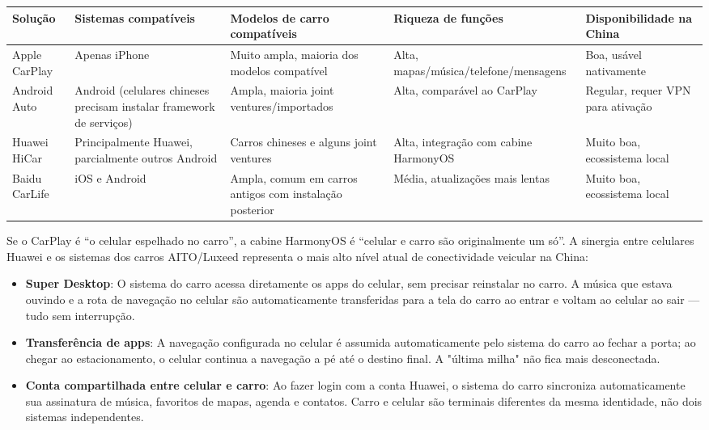 \begin{center}
\begin{tabularx}{\linewidth}{|X|X|X|X|X|}
\hline
\textbf{Solução} & \textbf{Sistemas compatíveis} & \textbf{Modelos de carro compatíveis} & \textbf{Riqueza de funções} & \textbf{Disponibilidade na China} \tabularnewline
\hline
Apple CarPlay & Apenas iPhone & Muito ampla, maioria dos modelos compatível & Alta, mapas/música/telefone/mensagens & Boa, usável nativamente \tabularnewline
Android Auto & Android (celulares chineses precisam instalar framework de serviços) & Ampla, maioria joint ventures/importados & Alta, comparável ao CarPlay & Regular, requer VPN para ativação \tabularnewline
Huawei HiCar & Principalmente Huawei, parcialmente outros Android & Carros chineses e alguns joint ventures & Alta, integração com cabine HarmonyOS & Muito boa, ecossistema local \tabularnewline
Baidu CarLife & iOS e Android & Ampla, comum em carros antigos com instalação posterior & Média, atualizações mais lentas & Muito boa, ecossistema local \tabularnewline
\hline
\end{tabularx}
\end{center}


Se o CarPlay é “o celular espelhado no carro”, a cabine HarmonyOS é “celular e carro são originalmente um só”. A sinergia entre celulares Huawei e os sistemas dos carros AITO/Luxeed representa o mais alto nível atual de conectividade veicular na China:

\begin{itemize}
  \item \textbf{Super Desktop}: O sistema do carro acessa diretamente os apps do celular, sem precisar reinstalar no carro. A música que estava ouvindo e a rota de navegação no celular são automaticamente transferidas para a tela do carro ao entrar e voltam ao celular ao sair — tudo sem interrupção.
  \item \textbf{Transferência de apps}: A navegação configurada no celular é assumida automaticamente pelo sistema do carro ao fechar a porta; ao chegar ao estacionamento, o celular continua a navegação a pé até o destino final. A "última milha" não fica mais desconectada.
  \item \textbf{Conta compartilhada entre celular e carro}: Ao fazer login com a conta Huawei, o sistema do carro sincroniza automaticamente sua assinatura de música, favoritos de mapas, agenda e contatos. Carro e celular são terminais diferentes da mesma identidade, não dois sistemas independentes.
\end{itemize}

